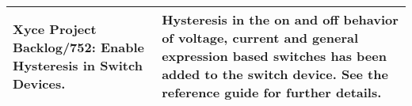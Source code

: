 {\begin{longtable}[h] {>{\raggedright\small}m{2in}|>{\raggedright\let\\\tabularnewline\small}m{3.5in}}
\textbf{Xyce Project Backlog/752}: Enable Hysteresis in Switch Devices.
&  Hysteresis in the on and off behavior of voltage, current and general 
expression based switches has been added to the switch device.  See the 
reference guide for further details. 
\\\hline


\end{longtable}
}
